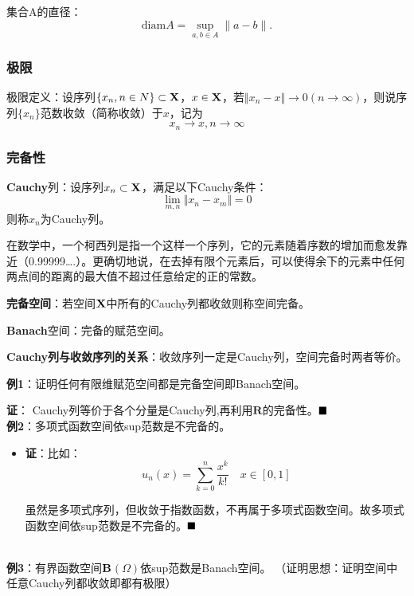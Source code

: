 \documentclass[12pt,a4paper]{article}
\begin{document}
集合$\mathrm{A}$的直径：
\begin{equation}
	\mathrm{diam} A=\sup _{a, b \in A}\|a-b\| .
\end{equation}
\subsubsection{极限}
极限定义：设序列$\{x_n,n\in N\}\subset \bf{X}$，$x\in \bf{X}$，若$\Vert x_n-x\Vert\rightarrow 0(n\rightarrow \infty)$，则说序列$\{x_n\}$范数收敛（简称收敛）于$x$，记为
\begin{equation}
	x_n\rightarrow x, n\rightarrow \infty
\end{equation}

\subsubsection{完备性}
\textbf{Cauchy}列：设序列${x_n}\subset \bf{X}$，满足以下Cauchy条件：
\begin{equation}
	\lim_{m,n}\Vert x_n-x_m\Vert =0
\end{equation}
则称$x_{n}$为Cauchy列。

在数学中，一个柯西列是指一个这样一个序列，它的元素随着序数的增加而愈发靠近（0.99999….）。更确切地说，在去掉有限个元素后，可以使得余下的元素中任何两点间的距离的最大值不超过任意给定的正的常数。

\textbf{完备空间}：若空间$\bf{X}$中所有的Cauchy列都收敛则称空间完备。

\textbf{Banach}空间：完备的赋范空间。

\textbf{Cauchy列与收敛序列的关系}：收敛序列一定是Cauchy列，空间完备时两者等价。

\textbf{例1}：证明任何有限维赋范空间都是完备空间即Banach空间。

\qquad\textbf{证}：
Cauchy列等价于各个分量是Cauchy列,再利用$\mathbf{R}$的完备性。$\hfill\blacksquare$
~\\

\textbf{例2}：多项式函数空间依sup范数是不完备的。
\begin{itemize}
	\item[]
	\textbf{证}：比如：
\begin{equation}
u_{n}(x)=\sum_{k=0}^{n} \frac{x^{k}}{k !} \quad x \in[0,1]
\end{equation}

虽然是多项式序列，但收敛于指数函数，不再属于多项式函数空间。故多项式函数空间依sup范数是不完备的。$\hfill\blacksquare$
\end{itemize}
~\\
\textbf{例3}：有界函数空间$\bf{B}$$(\Omega)$依sup范数是Banach空间。
（证明思想：证明空间中任意Cauchy列都收敛即都有极限）
\end{document}
